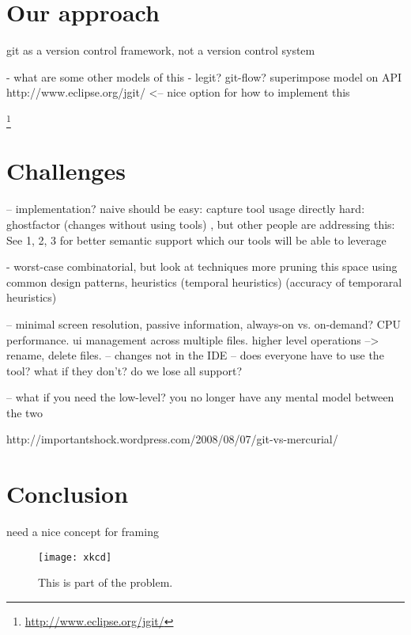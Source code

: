 \documentclass[conference]{IEEEtran}
\begin{document}
\section{Our approach}

git as a version control framework, not a version control system

- what are some other models of this
- legit? git-flow? superimpose model on API
http://www.eclipse.org/jgit/ <-- nice option for how to implement this

\footnote{\url{http://www.eclipse.org/jgit/}}

\section{Challenges}

-- implementation?
naive should be easy: capture tool usage directly  
hard: ghostfactor (changes without using tools) , but other people
 are addressing this: See 1, 2, 3 for better semantic support which our tools will be able to leverage
 
 - worst-case combinatorial, but look at techniques more pruning this space using common design patterns, heuristics (temporal heuristics) (accuracy of temporaral heuristics)
 
 -- minimal screen resolution, passive information, always-on vs. on-demand? CPU performance. ui management across multiple files. higher level operations --> rename, delete files.
 -- changes not in the IDE
 -- does everyone have to use the tool? what if they don't? do we lose all support?

 -- what if you need the low-level? you no longer have any mental model between the two
 
 http://importantshock.wordpress.com/2008/08/07/git-vs-mercurial/


\section{Conclusion}


need a nice concept for framing

\begin{figure}[!t]
\centering
\texttt{[image: xkcd]}
\caption{This is part of the problem.}
\label{fig:xkcd}
\end{figure}
\end{document}
